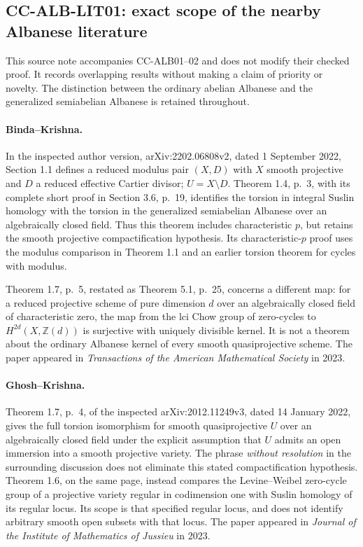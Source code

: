 \subsection{CC-ALB-LIT01: exact scope of the nearby Albanese literature}

This source note accompanies CC-ALB01--02 and does not modify their
checked proof. It records overlapping results without making a claim
of priority or novelty. The distinction between the ordinary abelian
Albanese and the generalized semiabelian Albanese is retained throughout.

\paragraph{Binda--Krishna.}
In the inspected author version, arXiv:2202.06808v2, dated 1 September
2022, Section 1.1 defines a reduced modulus pair \((X,D)\) with
\(X\) smooth projective and \(D\) a reduced effective Cartier divisor;
\(U=X\setminus D\). Theorem 1.4, p.~3, with its complete short proof in
Section 3.6, p.~19, identifies the torsion in integral Suslin homology
with the torsion in the generalized semiabelian Albanese over an
algebraically closed field. Thus this theorem includes characteristic
\(p\), but retains the smooth projective compactification hypothesis.
Its characteristic-\(p\) proof uses the modulus comparison in Theorem
1.1 and an earlier torsion theorem for cycles with modulus.

Theorem 1.7, p.~5, restated as Theorem 5.1, p.~25, concerns a different
map: for a reduced projective scheme of pure dimension \(d\) over an
algebraically closed field of characteristic zero, the map from the
lci Chow group of zero-cycles to \(H^{2d}(X,\mathbb Z(d))\) is
surjective with uniquely divisible kernel. It is not a theorem about
the ordinary Albanese kernel of every smooth quasiprojective scheme.
The paper appeared in \emph{Transactions of the American Mathematical
Society} in 2023.

\paragraph{Ghosh--Krishna.}
Theorem 1.7, p.~4, of the inspected arXiv:2012.11249v3, dated 14 January
2022, gives the full torsion isomorphism for smooth quasiprojective
\(U\) over an algebraically closed field under the explicit assumption
that \(U\) admits an open immersion into a smooth projective variety.
The phrase \emph{without resolution} in the surrounding discussion does
not eliminate this stated compactification hypothesis.
Theorem 1.6, on the same page, instead compares the Levine--Weibel
zero-cycle group of a projective variety regular in codimension one
with Suslin homology of its regular locus. Its scope is that specified
regular locus, and does not identify arbitrary smooth open subsets
with that locus. The paper appeared in \emph{Journal of the Institute
of Mathematics of Jussieu} in 2023.

